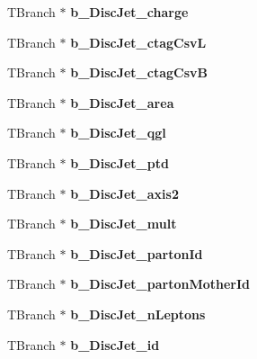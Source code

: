 \begin{DoxyCompactItemize}
T\+Branch $\ast$ {\bfseries b\+\_\+\+Disc\+Jet\+\_\+charge}
\item 
\hypertarget{classMiniTree_a80146744379e1093bdb9291c2a9db863}{}\label{classMiniTree_a80146744379e1093bdb9291c2a9db863} 
T\+Branch $\ast$ {\bfseries b\+\_\+\+Disc\+Jet\+\_\+ctag\+CsvL}
\item 
\hypertarget{classMiniTree_a3bf4c0e9165431fd340d15943987143e}{}\label{classMiniTree_a3bf4c0e9165431fd340d15943987143e} 
T\+Branch $\ast$ {\bfseries b\+\_\+\+Disc\+Jet\+\_\+ctag\+CsvB}
\item 
\hypertarget{classMiniTree_a6c67f411a4d1fb13e5e2e280637e9ef8}{}\label{classMiniTree_a6c67f411a4d1fb13e5e2e280637e9ef8} 
T\+Branch $\ast$ {\bfseries b\+\_\+\+Disc\+Jet\+\_\+area}
\item 
\hypertarget{classMiniTree_aaf13394fc7e9d673c5d4318786e48c29}{}\label{classMiniTree_aaf13394fc7e9d673c5d4318786e48c29} 
T\+Branch $\ast$ {\bfseries b\+\_\+\+Disc\+Jet\+\_\+qgl}
\item 
\hypertarget{classMiniTree_aaa9fb0d856cb056d66fbb242565fc6ba}{}\label{classMiniTree_aaa9fb0d856cb056d66fbb242565fc6ba} 
T\+Branch $\ast$ {\bfseries b\+\_\+\+Disc\+Jet\+\_\+ptd}
\item 
\hypertarget{classMiniTree_a8b78ce852c63e640263abad084bf5acf}{}\label{classMiniTree_a8b78ce852c63e640263abad084bf5acf} 
T\+Branch $\ast$ {\bfseries b\+\_\+\+Disc\+Jet\+\_\+axis2}
\item 
\hypertarget{classMiniTree_ad8a35dc8bcb188fe307824e240cd0753}{}\label{classMiniTree_ad8a35dc8bcb188fe307824e240cd0753} 
T\+Branch $\ast$ {\bfseries b\+\_\+\+Disc\+Jet\+\_\+mult}
\item 
\hypertarget{classMiniTree_a5daf1cee628a213ddfe73d72d382c045}{}\label{classMiniTree_a5daf1cee628a213ddfe73d72d382c045} 
T\+Branch $\ast$ {\bfseries b\+\_\+\+Disc\+Jet\+\_\+parton\+Id}
\item 
\hypertarget{classMiniTree_accb5cae749cbc40944d9799f8653220c}{}\label{classMiniTree_accb5cae749cbc40944d9799f8653220c} 
T\+Branch $\ast$ {\bfseries b\+\_\+\+Disc\+Jet\+\_\+parton\+Mother\+Id}
\item 
\hypertarget{classMiniTree_a874dff30322421acbde3861586361490}{}\label{classMiniTree_a874dff30322421acbde3861586361490} 
T\+Branch $\ast$ {\bfseries b\+\_\+\+Disc\+Jet\+\_\+n\+Leptons}
\item 
\hypertarget{classMiniTree_a7fc9d5089defd30eb6e5a1c50f5cc910}{}\label{classMiniTree_a7fc9d5089defd30eb6e5a1c50f5cc910} 
T\+Branch $\ast$ {\bfseries b\+\_\+\+Disc\+Jet\+\_\+id}
\item 

\end{DoxyCompactItemize}
